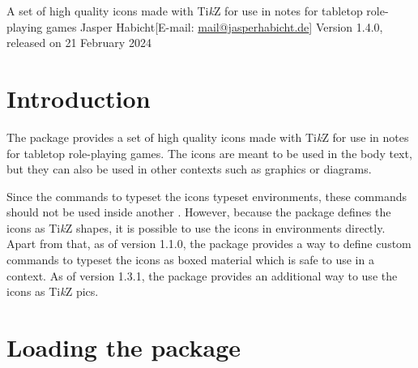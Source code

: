 \documentclass[a4paper]{article}
\def\dndiconsfileversion{1.4.0}
\def\dndiconsfiledate{21 February 2024}
\begin{document}
    {A set of high quality icons made with Ti\emph{k}Z for use in notes for tabletop role-playing games}
    {Jasper Habicht}[E-mail: \href{mailto:mail@jasperhabicht.de}{mail@jasperhabicht.de}]
    {Version \dndiconsfileversion, released on \dndiconsfiledate}


\bigskip

\section{Introduction}

The  package provides a set of high quality icons made with Ti\emph{k}Z for use in notes for tabletop role-playing games. The icons are meant to be used in the body text, but they can also be used in other contexts such as graphics or diagrams.

Since the commands to typeset the icons typeset  environments, these commands should not be used inside another . However, because the package defines the icons as Ti\emph{k}Z shapes, it is possible to use the icons in  environments directly. Apart from that, as of version 1.1.0, the package provides a way to define custom commands to typeset the icons as boxed material which is safe to use in a  context. As of version 1.3.1, the package provides an additional way to use the icons as Ti\emph{k}Z pics.

\section{Loading the package}
\end{document}
